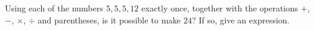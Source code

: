 Using each of the numbers $5,5,5,12$ exactly once, together with the operations $+$, $-$, $\times$, $\div$ and parentheses, is it possible to make $24$? If so, give an expression.
